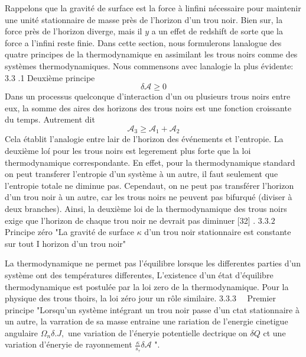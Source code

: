 \documentclass[12pt,  a4paper, openright]{report} %
\begin{document}
Rappelons que la gravité de surface est la force à linfini nécessaire pour maintenir une unité stationnaire de masse près de l'horizon d'un trou noir. Bien sur, la force près de l'horizon diverge, mais il $y$ a un effet de redshift de sorte que la force a l'infini reste finie. Dans cette section, nous formulerons lanalogue des quatre principes de la thermodynamique en assimilant les trous noirs comme des systèmes thermodynamiques. Nous commensons avec lanalogie la plus évidente:
3.3 .1 Deuxième principe
$$
\delta \mathcal{A} \geq 0
$$
Dans un processus quelconque d'interaction d'un ou plusieurs trous noirs entre eux, la somme des aires des horizons des trous noirs est une fonction croissante du temps. Autrement dit
$$
\mathcal{A}_{3} \geq \mathcal{A}_{1}+\mathcal{A}_{2}
$$
Cela établit l'analogie entre lair de l'horizon des événements et l'entropie. La deuxième loí pour les trous noirs est legerement plus forte que la loi thermodynamique correspondante. En effet, pour la thermodynamique standard on peut transferer l'entropie d'un système à un autre, il faut seulement que l'entropie totale ne diminue pas. Cependaut, on ne peut pas transférer l'horizon d'un trou noir à un autre, car les trous noirs ne peuvent pas bifurqué (diviser à deux branches). Ainsi, la deuxième loi de la thermodynamique des trous noirs exige que l'horizon de chaque trou noir ne devrait pas diminuer [32] .
$3.3 .2 \quad$ Principe zéro
"La gravité de surface $\kappa$ d'un trou noir stationnaire est constante sur tout I horizon d'un trou noir"

La thermodynamique ne permet pas l'équilibre lorsque les differentes parties d'un système ont des températures differentes, L'existence d'un état d'équilibre thermodynamique est postulée par la loi zero de la thermodynamique. Pour la physique des trous thoirs, la loi zéro jour un rôle similaire.
$3.3 .3 \quad$ Premier principe
"Lorsqu'un système intégrant un trou noir passe d'un ctat stationnaire à un autre, la varration de sa masse entraine une rariation de l'energie cinetigue angulaire $\Omega_{n} \delta . J,$ une variation de l'éneryie potentielle dectrique on $\delta Q$ ct une variation d'éneryie de rayonnement $\frac{\kappa}{s_{\tau}} \delta \mathcal{A}$ ".
\end{document}
